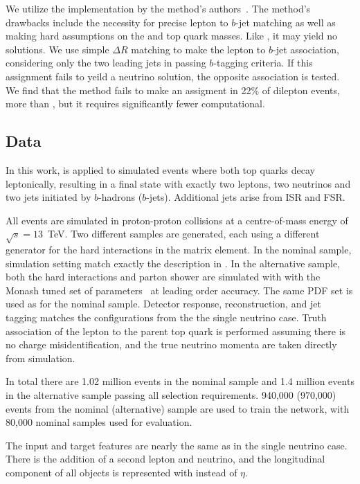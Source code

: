We utilize the implementation by the method's authors~\cite{EllipseCode}.
The method's drawbacks include the necessity for precise lepton to $b$-jet matching as well as making hard assumptions on the \Wboson and top quark masses.
Like \vweight, it may yield no solutions.
We use simple $\Delta R$ matching to make the lepton to $b$-jet association, considering only the two leading jets in passing $b$-tagging criteria.
If this assignment fails to yeild a neutrino solution, the opposite association is tested.
We find that the method fails to make an assigment in 22\% of \ttbar dilepton events, more than \vweight, but it requires significantly fewer computational.

\subsection{Data}

In this work, \vvflows is applied to simulated \ttbar events where both top quarks decay leptonically, resulting in a final state with exactly two leptons, two neutrinos and two jets initiated by $b$-hadrons ($b$-jets).
Additional jets arise from ISR and FSR.

All events are simulated in proton-proton collisions at a centre-of-mass energy of \mbox{$\sqrt{s}=13$~TeV}.
Two different samples are generated, each using a different generator for the hard interactions in the matrix element.
In the nominal sample, simulation setting match exactly the description in .
In the alternative sample, both the hard interactions and parton shower are simulated with  with the Monash tuned set of parameters~\cite{Monash} at leading order accuracy.
The same PDF set is used as for the nominal sample.
Detector response, reconstruction, and jet tagging matches the configurations from the the single neutrino case.
Truth association of the lepton to the parent top quark is performed assuming there is no charge misidentification, and the true neutrino momenta are taken directly from simulation.

In total there are 1.02 million events in the nominal sample and 1.4 million events in the alternative sample passing all selection requirements.
940,000 (970,000) events from the nominal (alternative) sample are used to train the network, with 80,000 nominal samples used for evaluation.

The input and target features are nearly the same as in the single neutrino case.
There is the addition of a second lepton and neutrino, and the longitudinal component of all objects is represented with \pz instead of $\eta$.

